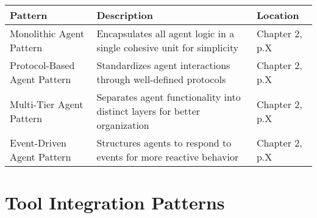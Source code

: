 \documentclass[11pt,oneside]{book}
\begin{document}
\begin{longtable}[]{@{}
  >{\raggedright\arraybackslash}p{}
  >{\raggedright\arraybackslash}p{}
  >{\raggedright\arraybackslash}p{}@{}}
\toprule\noalign{}
\begin{minipage}[b]{\linewidth}\raggedright
Pattern
\end{minipage} & \begin{minipage}[b]{\linewidth}\raggedright
Description
\end{minipage} & \begin{minipage}[b]{\linewidth}\raggedright
Location
\end{minipage} \\
\midrule\noalign{}
\endhead
\bottomrule\noalign{}
\endlastfoot
Monolithic Agent Pattern & Encapsulates all agent logic in a single
cohesive unit for simplicity & Chapter 2, p.X \\
Protocol-Based Agent Pattern & Standardizes agent interactions through
well-defined protocols & Chapter 2, p.X \\
Multi-Tier Agent Pattern & Separates agent functionality into distinct
layers for better organization & Chapter 2, p.X \\
Event-Driven Agent Pattern & Structures agents to respond to events for
more reactive behavior & Chapter 2, p.X \\
\end{longtable}

\section{Tool Integration Patterns}\label{tool-integration-patterns}
\end{document}
